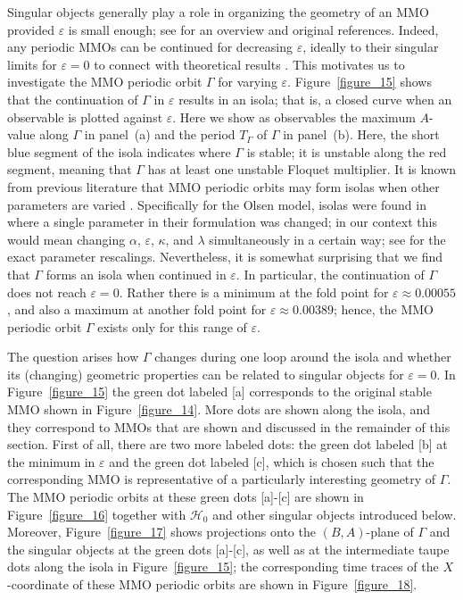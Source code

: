 \documentclass{ws-ijbc}
\begin{document}
Singular objects generally play a role in organizing the geometry of an MMO provided $\varepsilon$ is small enough; see \cite{MMO} for an overview and original references.  Indeed, any periodic MMOs can be continued for decreasing $\varepsilon$, ideally to their singular limits for $\varepsilon=0$ to connect with theoretical results \cite{Nonlinearity, MMO, Autocatalator}.  This motivates us to investigate the MMO periodic orbit $\Gamma$ for varying $\varepsilon$. Figure~\ref{figure_15} shows that the continuation of $\Gamma$ in $\varepsilon$ results in an isola; that is, a closed curve when an observable is plotted against $\varepsilon$. Here we show as observables the maximum $A$-value along $\Gamma$ in panel~(a) and the period $T_\Gamma$ of $\Gamma$ in panel~(b). Here, the short blue segment of the isola indicates where $\Gamma$ is stable; it is unstable along the red segment, meaning that $\Gamma$ has at least one unstable Floquet multiplier. It is known from previous literature that MMO periodic orbits may form isolas when other parameters are varied \cite{Nonlinearity, Forest_pest_model}.  Specifically for the Olsen model, isolas were found in \cite{QSSA} where a single parameter in their formulation was changed; in our context this would mean changing $\alpha$, $\varepsilon$, $\kappa$, and $\lambda$ simultaneously in a certain way; see \cite{Rescaling} for the exact parameter rescalings. Nevertheless, it is somewhat surprising that we find that $\Gamma$ forms an isola when continued in $\varepsilon$. In particular, the continuation of $\Gamma$ does not reach $\varepsilon=0$. Rather there is a minimum at the fold point for $\varepsilon \approx 0.00055$, and also a maximum at another fold point for $\varepsilon \approx 0.00389$; hence, the MMO periodic orbit $\Gamma$ exists only for this range of $\varepsilon$.  

The question arises how $\Gamma$ changes during one loop around the isola and whether its (changing) geometric properties can be related to singular objects for $\varepsilon=0$. In Figure~\ref{figure_15} the green dot labeled [a] corresponds to the original stable MMO shown in Figure~\ref{figure_14}. More dots are shown along the isola, and they correspond to MMOs that are shown and discussed in the remainder of this section. First of all, there are two more labeled dots: the green dot labeled [b] at the minimum in $\varepsilon$ and the green dot labeled [c], which is chosen such that the corresponding MMO is representative of a particularly interesting geometry of $\Gamma$. The MMO periodic orbits at these green dots [a]-[c] are shown in Figure~\ref{figure_16} together with $\mathscr{H}_0$ and other singular objects introduced below.  Moreover, Figure~\ref{figure_17} shows projections onto the $(B,A)$-plane of $\Gamma$ and the singular objects at the green dots [a]-[c], as well as at the intermediate taupe dots along the isola in Figure~\ref{figure_15}; the corresponding time traces of the $X$-coordinate of these MMO periodic orbits are shown in Figure~\ref{figure_18}.
\end{document}
